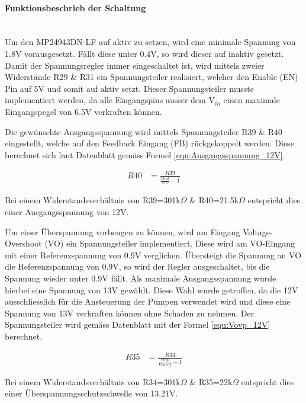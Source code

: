 \paragraph{Funktionsbeschrieb der Schaltung}\mbox{}\\

Um den MP24943DN-LF auf aktiv zu setzen, wird eine minimale Spannung von 1.8V vorausgesetzt. Fällt diese unter 0.4V, so wird dieser auf inaktiv gesetzt. Damit der Spannungsregler immer eingeschaltet ist, wird mittels zweier Widerstände R29 \& R31 ein Spannungsteiler realisiert, welcher den Enable (EN) Pin auf 5V und somit auf aktiv setzt. Dieser Spannungsteiler musste implementiert werden, da alle Eingangspins ausser dem V$_{in}$ einen maximale Eingangspegel von 6.5V verkraften können. 

Die gewünschte Ausgangsspannung wird mittels Spannungsteiler R39 \& R40 eingestellt, welche auf den Feedback Eingang (FB) rückgekoppelt werden. Diese berechnet sich laut Datenblatt gemäss Formel \ref{equ:Ausgangsspannung_12V}. 

\begin{align}
R40 &= \frac{R39}{\frac{Vout}{0.8}-1}
\label{equ:Ausgangsspannung_12V}
\end{align}

Bei einem Widerstandsverhältnis von R39=301k$\Omega$ \& R40=21.5k$\Omega$ entspricht dies einer Ausgangsspannung von 12V. 

Um einer Überspannung vorbeugen zu können, wird am Eingang Voltage-Overshoot (VO) ein Spannungsteiler implementiert. Diese wird am VO-Eingang mit einer Referenzspannung von 0.9V verglichen. Übersteigt die Spannung an VO die Referenzspannung von 0.9V, so wird der Regler ausgeschaltet, bis die Spannung wieder unter 0.9V fällt. Als maximale Ausgangsspannung wurde hierbei eine Spannung von 13V gewählt. Diese Wahl wurde getroffen, da die 12V ausschliesslich für die Ansteuerung der Pumpen verwendet wird und diese eine Spannung von 13V verkraften können ohne Schaden zu nehmen. Der Spannungsteiler wird gemäss Datenblatt mit der Formel \ref{equ:Vovp_12V} berechnet. 

\begin{align}
R35 &= \frac{R34}{\frac{Vovp}{Vovref}-1}
\label{equ:Vovp_12V}
\end{align}

Bei einem Widerstandsverhältnis von R34=301k$\Omega$ \& R35=22k$\Omega$ entspricht dies einer Überspannungsschutzschwelle von 13.21V. \cite{mouser_mp24943dn-lf_nodate}

